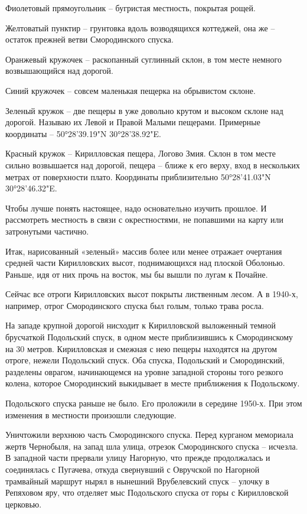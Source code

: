 Фиолетовый прямоугольник – бугристая местность, покрытая рощей. 

Желтоватый пунктир – грунтовка вдоль возводящихся коттеджей, она же – остаток прежней ветви Смородинского спуска.

Оранжевый кружочек – раскопанный суглинный склон, в том месте немного возвышающийся над дорогой.

Синий кружочек – совсем маленькая пещерка на обрывистом склоне.

Зеленый кружок – две пещеры в уже довольно крутом и высоком склоне над дорогой. Называю их Левой и Правой Малыми пещерами. Примерные координаты – 50°28'39.19"N 30°28'38.92"E.

Красный кружок – Кирилловская пещера, Логово Змия. Склон в том месте сильно возвышается над дорогой, пещера – ближе к его верху, вход в нескольких метрах от поверхности плато. Координаты приблизительно 50°28'41.03"N 30°28'46.32"E. 

Чтобы лучше понять настоящее, надо основательно изучить прошлое. И рассмотреть местность в связи с окрестностями, не попавшими на карту или затронутыми частично.

Итак, нарисованный «зеленый» массив более или менее отражает очертания средней части Кирилловских высот, поднимающихся над плоской Оболонью. Раньше, идя от них прочь на восток, мы бы вышли по лугам к Почайне.

Сейчас все отроги Кирилловских высот покрыты лиственным лесом. А в 1940-х, например, отрог Смородинского спуска был голым, только трава росла.

На западе крупной дорогой нисходит к Кирилловской выложенный темной брусчаткой Подольский спуск, в одном месте приблизившись к Смородинскому на 30 метров. Кирилловская и смежная с нею пещеры находятся на другом отроге, нежели Подольский спуск. Оба спуска, Подольский и Смородинский, разделены оврагом, начинающемся на уровне западной стороны того резкого колена, которое Смородинский выкидывает в месте приближения к Подольскому.

Подольского спуска раньше не было. Его проложили в середине 1950-х. При этом изменения в местности произошли следующие. 

Уничтожили верхнюю часть Смородинского спуска. Перед курганом мемориала жертв Чернобыля, на запад шла улица, отрезок Смородинского спуска – исчезла. В западной части прервали улицу Нагорную, что прежде продолжалась и соединялась с Пугачева, откуда свернувший с Овручской по Нагорной трамвайный маршрут нырял в нынешний Врубелевский спуск – улочку в Репяховом яру, что отделяет мыс Подольского спуска от горы с Кирилловской церковью.

